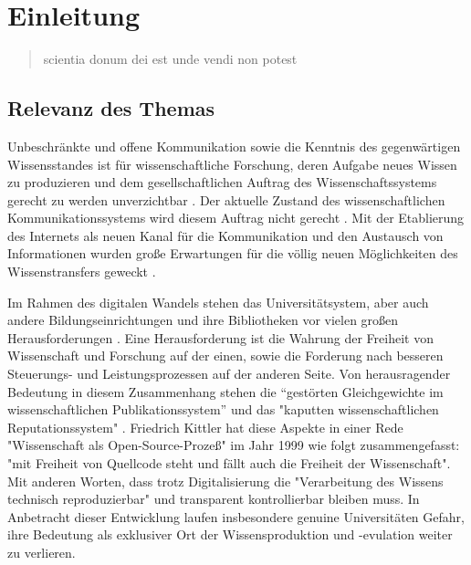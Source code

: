\chapter{Einleitung} 
\begin{quote}
scientia donum dei est unde vendi non potest
\end{quote}

\section{Relevanz des Themas} 

Unbeschränkte und offene Kommunikation sowie die Kenntnis des gegenwärtigen Wissensstandes ist für wissenschaftliche Forschung, deren Aufgabe neues Wissen zu produzieren und dem gesellschaftlichen Auftrag des Wissenschaftssystems gerecht zu werden unverzichtbar \cite{Hanekop_2014} \cite{glaeser2006} \cite{gibbons_1994} \cite{Luhmann1998}. Der aktuelle Zustand des wissenschaftlichen Kommunikationssystems wird diesem Auftrag nicht gerecht \cite{Schekman_2013}. Mit der Etablierung des Internets als neuen Kanal für die Kommunikation und den Austausch von Informationen wurden große Erwartungen für die völlig neuen Möglichkeiten des Wissenstransfers geweckt \cite{Hanekop_2014} \cite{schulze_2013_open} \cite{albert_2006_open_implications} \cite{Goodrum_2001} \cite{Lawrence_1999}.

Im Rahmen des digitalen Wandels stehen das Universitätsystem, aber auch andere Bildungseinrichtungen und ihre Bibliotheken vor vielen großen Herausforderungen \cite{Harter2006} \cite{Gu_don_2004} \cite{osterloh2008anreize}. Eine Herausforderung ist die Wahrung der Freiheit von Wissenschaft und Forschung auf der einen,  sowie die Forderung nach besseren Steuerungs- und Leistungsprozessen \cite{Adler_2009} \cite{gibbons_1994} auf der anderen Seite. Von herausragender Bedeutung in diesem Zusammenhang stehen die “gestörten Gleichgewichte im wissenschaftlichen Publikationssystem” \cite{cite:0} und das "kaputten wissenschaftlichen Reputationssystem" \cite{suchen}. Friedrich Kittler hat diese Aspekte in einer Rede "Wissenschaft als Open-Source-Prozeß" im Jahr 1999 wie folgt zusammengefasst: "mit Freiheit von Quellcode steht und fällt auch die Freiheit der Wissenschaft". Mit anderen Worten, dass trotz Digitalisierung die "Verarbeitung des Wissens technisch reproduzierbar" \cite{cite:1} und transparent kontrollierbar \cite{suchen} bleiben muss. In Anbetracht dieser Entwicklung laufen insbesondere genuine Universitäten Gefahr, ihre Bedeutung als exklusiver Ort der Wissensproduktion \cite{suchen} und -evulation \cite{suchen} weiter zu verlieren.

